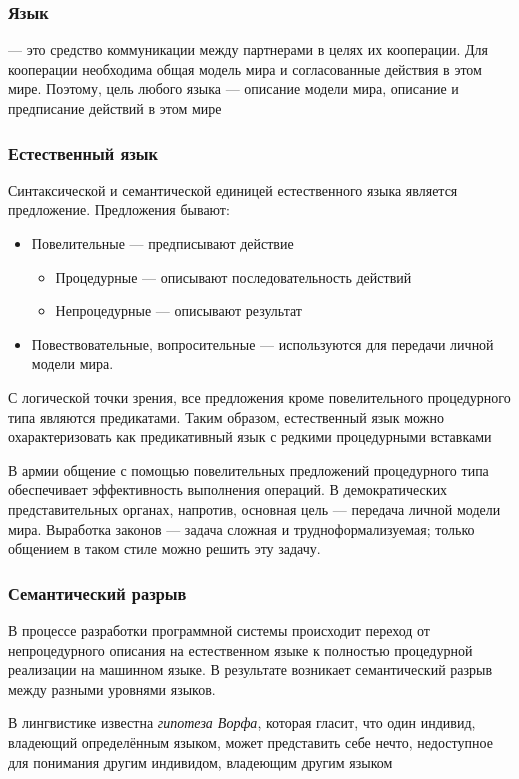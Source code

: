 \documentclass[a4paper, 14pt]{extarticle}
\begin{document}
\subsubsection*{Язык}
 --- это средство коммуникации между партнерами в целях их кооперации. Для кооперации необходима общая модель мира и согласованные действия в этом мире. Поэтому, цель любого языка --- описание модели мира, описание и предписание действий в этом мире

\subsubsection*{Естественный язык}
Синтаксической и семантической единицей естественного языка является предложение. Предложения бывают:
\begin{itemize}
    \item Повелительные --- предписывают действие
    \begin{itemize}
        \item Процедурные --- описывают последовательность действий
        \item Непроцедурные --- описывают результат
    \end{itemize}
    \item Повествовательные, вопросительные --- используются для передачи личной модели мира.
\end{itemize}

С логической точки зрения, все предложения кроме повелительного процедурного типа являются предикатами. Таким образом, естественный язык можно охарактеризовать как предикативный язык с редкими процедурными вставками 

В армии общение с помощью повелительных предложений процедурного типа обеспечивает эффективность выполнения операций. В демократических представительных органах, напротив, основная цель --- передача личной модели мира. Выработка законов --- задача сложная и трудноформализуемая; только общением в таком стиле можно решить эту задачу.

\subsubsection*{Семантический разрыв}
В процессе разработки программной системы происходит переход от непроцедурного описания на естественном языке к полностью процедурной реализации на машинном языке. В результате возникает семантический разрыв между разными уровнями языков.

В лингвистике известна \textit{гипотеза Ворфа}, которая гласит, что один индивид, владеющий определённым языком, может представить себе нечто, недоступное для понимания другим индивидом, владеющим другим языком
\end{document}
